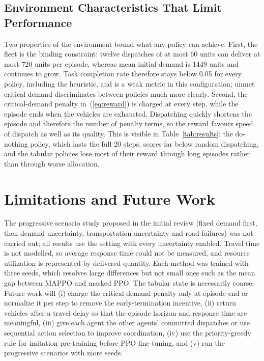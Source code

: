 \documentclass[conference]{IEEEtran}
\begin{document}
\subsection{Environment Characteristics That Limit Performance}
\label{sec:envlimits}
Two properties of the environment bound what any policy can achieve. First, the fleet is the binding constraint: twelve dispatches of at most 60 units can deliver at most 720 units per episode, whereas mean initial demand is 1449 units and continues to grow. Task completion rate therefore stays below 0.05 for every policy, including the heuristic, and is a weak metric in this configuration; unmet critical demand discriminates between policies much more clearly. Second, the critical-demand penalty in~(\ref{eq:reward}) is charged at every step, while the episode ends when the vehicles are exhausted. Dispatching quickly shortens the episode and therefore the number of penalty terms, so the reward favours speed of dispatch as well as its quality. This is visible in Table~\ref{tab:results}: the do-nothing policy, which lasts the full 20 steps, scores far below random dispatching, and the tabular policies lose most of their reward through long episodes rather than through worse allocation.

\section{Limitations and Future Work}
The progressive scenario study proposed in the initial review (fixed demand first, then demand uncertainty, transportation uncertainty and road failures) was not carried out; all results use the setting with every uncertainty enabled. Travel time is not modelled, so average response time could not be measured, and resource utilization is represented by delivered quantity. Each method was trained with three seeds, which resolves large differences but not small ones such as the mean gap between MAPPO and masked PPO. The tabular state is necessarily coarse. Future work will (i) charge the critical-demand penalty only at episode end or normalize it per step to remove the early-termination incentive, (ii) return vehicles after a travel delay so that the episode horizon and response time are meaningful, (iii) give each agent the other agents' committed dispatches or use sequential action selection to improve coordination, (iv) use the priority-greedy rule for imitation pre-training before PPO fine-tuning, and (v) run the progressive scenarios with more seeds.
\end{document}
